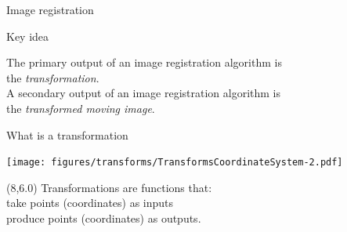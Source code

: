 \documentclass[aspectratio=169]{beamer}
\begin{document}
\begin{frame}{Image registration}
{\begin{center}
        \end{center}
    }

\end{frame}

\begin{frame}{Key idea}

    The primary output of an image registration algorithm is \\
    the \emph{transformation}. \\ 
    \vspace{1em}
    A secondary output of an image registration algorithm is \\ 
    the \emph{transformed moving image}.

\end{frame}

\begin{frame}{What is a transformation}

            \vspace{1em}  
            \texttt{[image: figures/transforms/TransformsCoordinateSystem-2.pdf]}


        \begin{textblock}{7}(8,6.0)
            Transformations are functions that: \\
            take points (coordinates) as inputs \\
            produce points (coordinates) as outputs.
        \end{textblock}

\end{frame}
\end{document}
